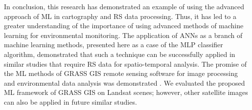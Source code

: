 \documentclass[water,article,accept,pdftex,oneauhor]{Definitions/mdpi}
\begin{document}
{{{{In conclusion, }this research has demonstrated an example of using the advanced approach of ML in cartography and RS data processing. Thus, it has led to a greater understanding of the importance of using advanced methods of machine learning for environmental monitoring. The application of ANNs as a branch of machine learning methods, presented here as a case of the MLP classifier algorithm, demonstrated that such a technique can be successfully applied in similar studies that require RS data for spatio-temporal analysis. The promise of the ML methods of GRASS GIS remote sensing software for image processing and environmental data analysis was demonstrated%
. We evaluated the proposed ML framework of GRASS GIS on Landsat scenes; however, other satellite images can also be applied in future similar studies.
\vspace{6pt} 









}}}
\end{document}
